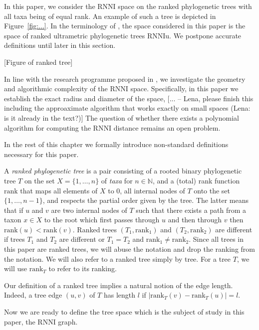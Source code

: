 \documentclass{amsart}
\newcommand{\rank}{\mathrm{rank}}
\newcommand{\rnni}{\mathrm{RNNI}}
\newcommand{\rnniu}{\mathrm{RNNIu}}
\begin{document}
In this paper, we consider the $\rnni$ space on the ranked phylogenetic trees with all taxa being of equal rank.
An example of such a tree is depicted in Figure~\ref{fig:...}.
In the terminology of \autocite{Gavryushkin2018-ol}, the space considered in this paper is the space of ranked ultrametric phylogenetic trees $\rnniu$.
We postpone accurate definitions until later in this section.

[Figure of ranked tree]

In line with the research programme proposed in \autocite{Gavryushkin2018-ol}, we investigate the geometry and algorithmic complexity of the $\rnni$ space.
Specifically, in this paper we establish the exact radius and diameter of the space, [... -- Lena, please finish this including the approaximate algorithm that works exactly on small spaces (Lena: is it already in the text?)]
The question of whether there exists a polynomial algorithm for computing the $\rnni$ distance remains an open problem.

In the rest of this chapter we formally introduce non-standard definitions necessary for this paper.

A \emph{ranked phylogenetic tree} is a pair consisting of a rooted binary phylogenetic tree $T$ on the set $X = \{1, \ldots, n\}$ of \emph{taxa} for $n \in \mathbb N$, and a (total) rank function $\rank$ that maps all elements of $X$ to $0$, all internal nodes of $T$ onto the set $\{1, \ldots, n-1\}$, and respects the partial order given by the tree.
The latter means that if $u$ and $v$ are two internal nodes of $T$ such that there exists a path from a taxon $x \in X$ to the root which first passes through $u$ and then through $v$ then $\rank(u) < \rank(v)$.
Ranked trees $(T_1, \rank_1)$ and $(T_2, \rank_2)$ are different if trees $T_1$ and $T_2$ are different or $T_1 = T_2$ and $\rank_1 \neq \rank_2$.
Since all trees in this paper are ranked trees, we will abuse the notation and drop the ranking from the notation.
We will also refer to a ranked tree simply by tree.
For a tree $T$, we will use $\rank_T$ to refer to its ranking.

Our definition of a ranked tree implies a natural notion of the edge length.
Indeed, a tree edge $(u,v)$ of $T$ has length $l$ if $|\rank_T(v) - \rank_T(u)| = l$.

Now we are ready to define the tree space which is the subject of study in this paper, the $\rnni$ graph.
\end{document}
